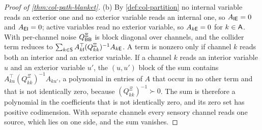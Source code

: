 \begin{proof}[Proof of \cref{thm:col-path-blanket}]
(b) By \cref{def:col-partition} no internal variable reads an exterior one and no exterior variable reads an internal one, so $A_{\mathsf{I}\mathsf{E}}=0$ and $A_{\mathsf{E}\mathsf{I}}=0$; active variables read no exterior variable, so $A_{k\mathsf{E}}=0$ for $k\in\mathsf{A}$. With per-channel noise $Q^{\Xi}_{\mathsf{B}\mathsf{B}}$ is block diagonal over channels, and the collider term reduces to $\sum_{k\in\mathsf{S}}A_{k\mathsf{I}}^\top(Q^{\Xi}_{kk})^{-1}A_{k\mathsf{E}}$. A term is nonzero only if channel $k$ reads both an interior and an exterior variable. If a channel $k$ reads an interior variable $u$ and an exterior variable $u'$, the $(u,u')$ block of the sum contains $A_{ku}^\top(Q^{\Xi}_{kk})^{-1}A_{ku'}$, a polynomial in entries of $A$ that occur in no other term and that is not identically zero, because $(Q^{\Xi}_{kk})^{-1}\succ0$. The sum is therefore a polynomial in the coefficients that is not identically zero, and its zero set has positive codimension. With separate channels every sensory channel reads one source, which lies on one side, and the sum vanishes.


\end{proof}
